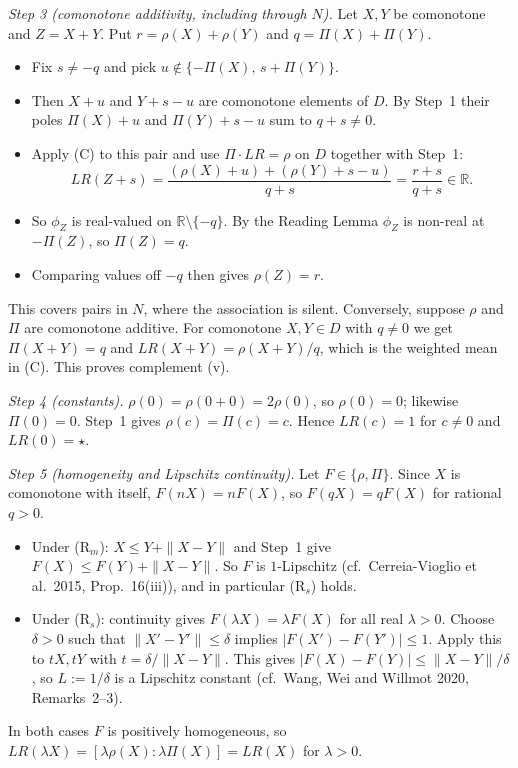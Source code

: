 \textit{Step 3 (comonotone additivity, including through $N$).} Let $X,Y$ be comonotone and $Z=X+Y$. Put $r=\rho(X)+\rho(Y)$ and $q=\Pi(X)+\Pi(Y)$.
\begin{itemize}
\item Fix $s\neq-q$ and pick $u\notin\{-\Pi(X),\,s+\Pi(Y)\}$.
\item Then $X+u$ and $Y+s-u$ are comonotone elements of $D$. By Step~1 their poles $\Pi(X)+u$ and $\Pi(Y)+s-u$ sum to $q+s\neq0$.
\item Apply (C) to this pair and use $\Pi\cdot LR=\rho$ on $D$ together with Step~1:
\[
LR(Z+s)=\frac{(\rho(X)+u)+(\rho(Y)+s-u)}{q+s}=\frac{r+s}{q+s}\in\mathbb R .
\]
\item So $\phi_Z$ is real-valued on $\mathbb R\setminus\{-q\}$. By the Reading Lemma $\phi_Z$ is non-real at $-\Pi(Z)$, so $\Pi(Z)=q$.
\item Comparing values off $-q$ then gives $\rho(Z)=r$.
\end{itemize}
This covers pairs in $N$, where the association is silent. Conversely, suppose $\rho$ and $\Pi$ are comonotone additive. For comonotone $X,Y\in D$ with $q\neq0$ we get $\Pi(X+Y)=q$ and $LR(X+Y)=\rho(X+Y)/q$, which is the weighted mean in (C). This proves complement (v).

\textit{Step 4 (constants).} $\rho(0)=\rho(0+0)=2\rho(0)$, so $\rho(0)=0$; likewise $\Pi(0)=0$. Step~1 gives $\rho(c)=\Pi(c)=c$. Hence $LR(c)=1$ for $c\neq0$ and $LR(0)=\star$.

\textit{Step 5 (homogeneity and Lipschitz continuity).} Let $F\in\{\rho,\Pi\}$. Since $X$ is comonotone with itself, $F(nX)=nF(X)$, so $F(qX)=qF(X)$ for rational $q>0$.
\begin{itemize}
\item Under (R$_m$): $X\le Y+\|X-Y\|$ and Step~1 give $F(X)\le F(Y)+\|X-Y\|$. So $F$ is $1$-Lipschitz (cf.\ Cerreia-Vioglio et al.\ 2015, Prop.~16(iii)), and in particular (R$_s$) holds.
\item Under (R$_s$): continuity gives $F(\lambda X)=\lambda F(X)$ for all real $\lambda>0$. Choose $\delta>0$ such that $\|X'-Y'\|\le\delta$ implies $|F(X')-F(Y')|\le1$. Apply this to $tX,tY$ with $t=\delta/\|X-Y\|$. This gives $|F(X)-F(Y)|\le\|X-Y\|/\delta$, so $L:=1/\delta$ is a Lipschitz constant (cf.\ Wang, Wei and Willmot 2020, Remarks~2--3).
\end{itemize}
In both cases $F$ is positively homogeneous, so $LR(\lambda X)=[\lambda\rho(X):\lambda\Pi(X)]=LR(X)$ for $\lambda>0$.

